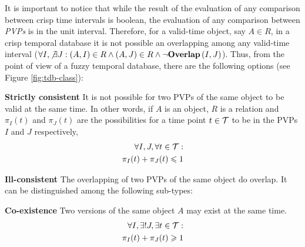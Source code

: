 It is important to notice that while the result of the evaluation of any comparison between crisp time intervals is boolean, the evaluation of any comparison between \emph{PVPs} is in the unit interval.  Therefore, for a valid-time object, say $A \in R$, in a crisp temporal database it is not possible an overlapping among any valid-time interval ($\forall I, \not \exists J: \left(A, I \right) \in R \wedge \left(A, J \right) \in R \wedge \lnot \mbox{\textbf{Overlap}}\left(I, J \right)$). Thus, from the point of view of a fuzzy temporal database, there are the following options (see Figure \ref{fig:tdb-class}):

\begin{definition}
\textbf{Strictly consistent} It is not possible for two PVPs of the same object to be valid at the same time. In other words, if $A$ is an object, $R$ is a relation and $\pi_{I}\left(t \right)$ and $\pi_{J}\left(t \right)$ are the possibilities for a time point $t \in \mathcal{T}$ to be in the PVPs $I$ and $J$ respectively,
\begin{align}
\label{eq:stricly-consistent}
\forall I,J, \forall t \in \mathcal{T} :\\
\nonumber
\pi_{I}(t) + \pi_{J}(t) \leqslant 1
\end{align}
\end{definition}




\begin{definition}
 \textbf{Ill-consistent} The overlapping of two PVPs of the same object do overlap. It can be distinguished among the following sub-types:
\end{definition}
	      \begin{definition}
	      \textbf{Co-existence} Two versions of the same object $A$ may exist at the same time.
		      \begin{align}
		      \label{eq:co-existence}
		      \forall I, \exists ! J, \exists t \in \mathcal{T} : \\
		      \nonumber
		      \pi_{I}(t) + \pi_{J}(t) \geqslant 1
		      \end{align}
	      \end{definition}


